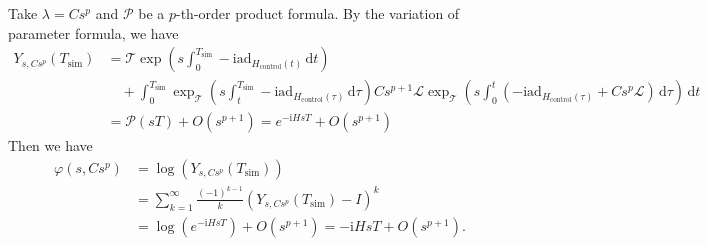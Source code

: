 \documentclass[11pt]{article}
\renewcommand{\i}{\mathrm{i}}
\renewcommand{\d}{\mathrm{d}}
\renewcommand{\L}{\mathcal{L}}
\newcommand{\ad}{\mathrm{ad}}
\newcommand{\T}{\mathcal{T}}
\renewcommand{\P}{\mathcal{P}}
\newcommand{\simu}{\mathrm{sim}}
\newcommand{\Hc}{H_{\mathrm{control}}}
\begin{document}
Take $\lambda = C s^p$ and $\P$ be a $p$-th-order product formula. By the variation of parameter formula, we have \begin{align*}
    Y_{s,Cs^p}(T_{\simu}) & = \T \exp(s\int_0^{T_{\simu}}-\i \ad_{\Hc(t)} \, \d t)\\
    &\quad+\int_{0}^{T_{\simu}} \exp_{\T}(s\int_{t}^{T_{\simu}}-\i \ad_{\Hc(\tau)}\, \d \tau )Cs^{p+1}\L\exp_{\T}(s\int_{0}^{t}(-\i \ad_{\Hc(\tau)}+Cs^p\L)\, \d \tau )\, \d t \\
     &= \P(sT)+O(s^{p+1}) = e^{-\i HsT}+O(s^{p+1})
\end{align*}
Then we have \begin{align*}
    \varphi(s,Cs^{p}) &= \log(Y_{s,Cs^p}(T_{\simu}))\\
    & =\sum_{k=1}^{\infty}\frac{(-1)^{k-1}}{k}(Y_{s,Cs^p}(T_{\simu})-I)^k \\
    & = \log(e^{-\i H s T})+O(s^{p+1})=-\i HsT + O(s^{p+1}).
\end{align*}



\end{document}
